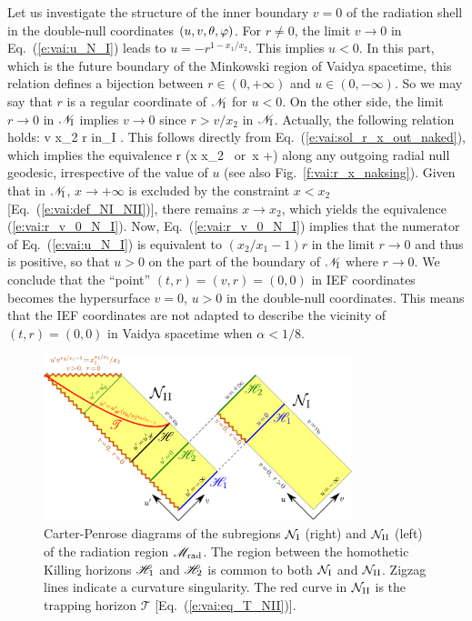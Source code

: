 Let us investigate the structure of the inner boundary $v=0$ of the radiation
shell in the double-null coordinates $(u, v, \theta, \varphi)$. For $r\neq 0$,
the limit $v\to 0$ in Eq.~(\ref{e:vai:u_N_I}) leads to $u = - r^{1 - x_1/x_2}$.
This implies $u < 0$. In this part, which is the future boundary of the Minkowski
region of Vaidya spacetime, this relation defines a bijection between
$r\in(0,+\infty)$ and $u\in(0, -\infty)$. So we may say that $r$ is a regular
coordinate of $\mathscr{N}_{\rm I}$ for $u < 0$. On the other side,
the limit $r\to 0$ in $\mathscr{N}_{\rm I}$ implies $v\to 0$ since $r > v /x_2$
in $\mathscr{N}_{\rm I}$. Actually, the following relation holds:
\be \label{e:vai:r_v_0_N_I}
    v  x_2 r \quad\mbox{in}\quad {}_{\rm I} .
\ee
This follows directly from Eq.~(\ref{e:vai:sol_r_x_out_naked}), which implies
the equivalence
\be \label{e:vai:r_to_0_outgoing}
    r \iff (x \to x_2 \ \mbox{or}\  x \to +\infty)
\ee
along any outgoing radial null geodesic, irrespective
of the value of $u$ (see also Fig.~\ref{f:vai:r_x_naksing}).
Given that in $\mathscr{N}_{\rm I}$, $x \to +\infty$ is excluded
by the constraint $x < x_2$ [Eq.~(\ref{e:vai:def_NI_NII})], there remains $x\to x_2$,
which yields the equivalence (\ref{e:vai:r_v_0_N_I}).
Now, Eq.~(\ref{e:vai:r_v_0_N_I}) implies that the numerator of Eq.~(\ref{e:vai:u_N_I})
is equivalent to $(x_2/x_1 - 1) r$ in the limit $r\to 0$ and thus
is positive, so that $u > 0$ on the part of the boundary of $\mathscr{N}_{\rm I}$
where $r\to 0$.
We conclude that the ``point'' $(t,r) = (v,r) = (0,0)$ in IEF coordinates
becomes the hypersurface $v = 0$, $u > 0$ in the double-null coordinates. This means
that the IEF coordinates are not adapted to describe the vicinity of $(t,r) = (0,0)$
in Vaidya spacetime when $\alpha < 1/8$.

\begin{figure}
\centerline{\includegraphics[width=0.8\textwidth]{vai_CPdiag_NI_NII.pdf}}
\caption[]{\label{f:vai:CPdiag_NI_NII} \footnotesize
Carter-Penrose diagrams of the subregions $\mathcal{N}_{\rm I}$ (right) and
$\mathcal{N}_{\rm II}$ (left) of the radiation region $\mathscr{M}_{\rm rad}$. The region
between the homothetic Killing horizons $\mathscr{H}_1$ and $\mathscr{H}_2$ is common to
both $\mathcal{N}_{\rm I}$ and $\mathcal{N}_{\rm II}$.
Zigzag lines indicate a curvature singularity. The red curve in $\mathcal{N}_{\rm II}$
is the trapping horizon $\mathscr{T}$ [Eq.~(\ref{e:vai:eq_T_NII})].
}
\end{figure}

